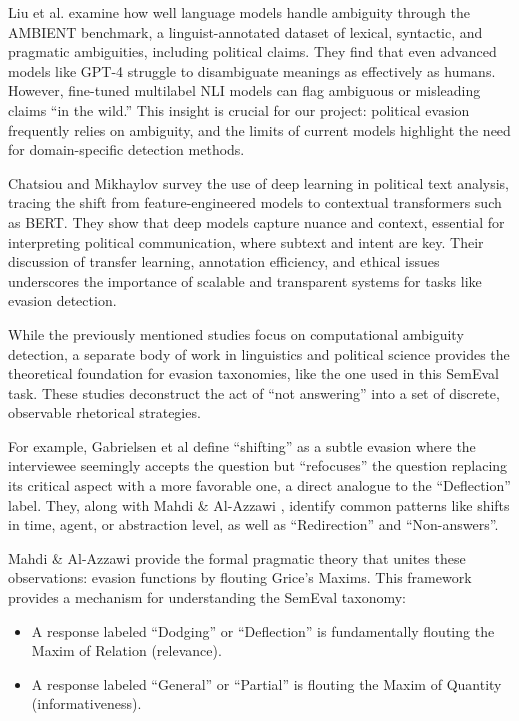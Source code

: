 \documentclass[conference]{IEEEtran}
\begin{document}
Liu et al. \cite{b2} examine how well language models handle ambiguity through the AMBIENT benchmark, a linguist-annotated dataset of lexical, syntactic, and pragmatic ambiguities, including political claims. They find that even advanced models like GPT-4 struggle to disambiguate meanings as effectively as humans. However, fine-tuned multilabel NLI models can flag ambiguous or misleading claims “in the wild.” This insight is crucial for our project: political evasion frequently relies on ambiguity, and the limits of current models highlight the need for domain-specific detection methods.

Chatsiou and Mikhaylov \cite{b3} survey the use of deep learning in political text analysis, tracing the shift from feature-engineered models to contextual transformers such as BERT. They show that deep models capture nuance and context, essential for interpreting political communication, where subtext and intent are key. Their discussion of transfer learning, annotation efficiency, and ethical issues underscores the importance of scalable and transparent systems for tasks like evasion detection.

While the previously mentioned studies focus on computational ambiguity detection, a separate body of work in linguistics and political science provides the theoretical foundation for evasion taxonomies, like the one used in this SemEval task. These studies deconstruct the act of ``not answering'' into a set of discrete, observable rhetorical strategies.

For example, Gabrielsen et al \cite{b5} define ``shifting'' as a subtle evasion where the interviewee seemingly accepts the question but ``refocuses'' the question replacing its critical aspect with a more favorable one, a direct analogue to the ``Deflection'' label. They, along with Mahdi \& Al-Azzawi \cite{b6}, identify common patterns like shifts in time, agent, or abstraction level, as well as ``Redirection'' and ``Non-answers''.

Mahdi \& Al-Azzawi \cite{b6} provide the formal pragmatic theory that unites these observations: evasion functions by flouting Grice's Maxims. This framework provides a mechanism for understanding the SemEval taxonomy: \begin{itemize} \item A response labeled ``Dodging'' or ``Deflection'' is fundamentally flouting the Maxim of Relation (relevance). \item A response labeled ``General'' or ``Partial'' is flouting the Maxim of Quantity (informativeness). \end{itemize}
\end{document}

